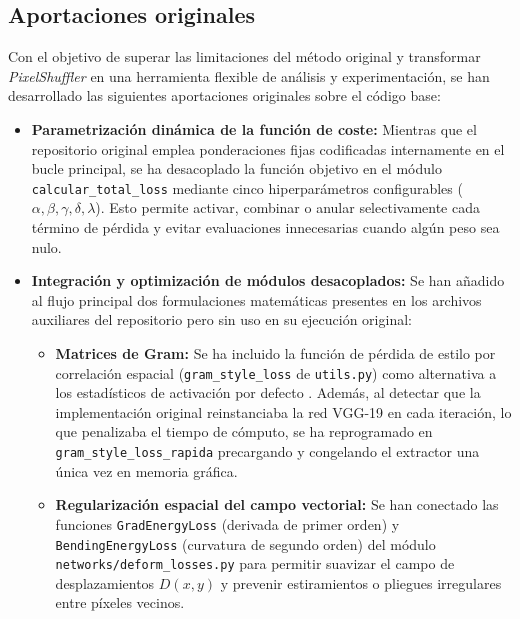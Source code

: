 \documentclass[a4paper]{article}
\begin{document}
\subsection{Aportaciones originales}

\noindent Con el objetivo de superar las limitaciones del método original y transformar \textit{PixelShuffler} en una herramienta flexible de análisis y experimentación, se han desarrollado las siguientes aportaciones originales sobre el código base:

\begin{itemize}
    \item \textbf{Parametrización dinámica de la función de coste:} Mientras que el repositorio original emplea ponderaciones fijas codificadas internamente en el bucle principal, se ha desacoplado la función objetivo en el módulo \texttt{calcular\_total\_loss} mediante cinco hiperparámetros configurables ($\alpha, \beta, \gamma, \delta, \lambda$). Esto permite activar, combinar o anular selectivamente cada término de pérdida y evitar evaluaciones innecesarias cuando algún peso sea nulo.
    
    \item \textbf{Integración y optimización de módulos desacoplados:} Se han añadido al flujo principal dos formulaciones matemáticas presentes en los archivos auxiliares del repositorio pero sin uso en su ejecución original:
    \begin{itemize}
        \item \textbf{Matrices de Gram:} Se ha incluido la función de pérdida de estilo por correlación espacial (\texttt{gram\_style\_loss} de \texttt{utils.py}) como alternativa a los estadísticos de activación por defecto \cite{gatys2015neural}. Además, al detectar que la implementación original reinstanciaba la red VGG-19 en cada iteración, lo que penalizaba el tiempo de cómputo, se ha reprogramado en \texttt{gram\_style\_loss\_rapida} precargando y congelando el extractor una única vez en memoria gráfica.
        \item \textbf{Regularización espacial del campo vectorial:} Se han conectado las funciones \texttt{GradEnergyLoss} (derivada de primer orden) y \texttt{BendingEnergyLoss} (curvatura de segundo orden) del módulo \texttt{networks/deform\_losses.py} para permitir suavizar el campo de desplazamientos $D(x, y)$ y prevenir estiramientos o pliegues irregulares entre píxeles vecinos.
    \end{itemize}
    

\end{itemize}
\end{document}

